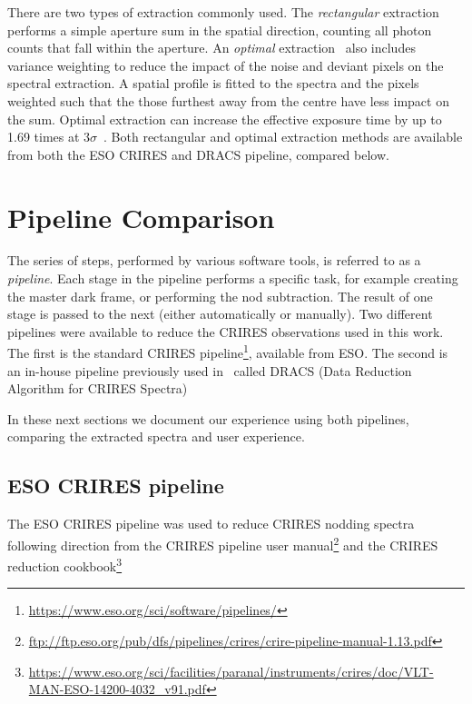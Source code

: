 There are two types of extraction commonly used.
The \emph{rectangular} extraction performs a simple aperture sum in the spatial direction, counting all photon counts that fall within the aperture.
An \emph{optimal} extraction~\citep{horne_optimal_1986} also includes variance weighting to reduce the impact of the noise and deviant pixels on the spectral extraction.
A spatial profile is fitted to the spectra and the pixels weighted such that the those furthest away from the centre have less impact on the sum.
Optimal extraction can increase the effective exposure time by up to 1.69 times at \(3 \sigma\)~\citep{horne_optimal_1986}.
Both rectangular and optimal extraction methods are available from both the {ESO} {CRIRES} and {DRACS} pipeline, compared below.

\section{Pipeline Comparison}
\label{sec:pipelines}
 The series of steps, performed by various software tools, is referred to as a \emph{pipeline}.
Each stage in the pipeline performs a specific task, for example creating the master dark frame, or performing the nod subtraction.
The result of one stage is passed to the next (either automatically or manually).
Two different pipelines were available to reduce the {CRIRES} observations used in this work.
The first is the standard {CRIRES} pipeline\footnote{\href{https://www.eso.org/sci/software/pipelines/}{https://www.eso.org/sci/software/pipelines/}}, available from {ESO}.
The second is an in-house pipeline previously used in~\citet{figueira_radial_2010} called {DRACS} (Data Reduction Algorithm for {CRIRES} Spectra) 

In these next sections we document our experience using both pipelines, comparing the extracted spectra and user experience.


\subsection{{ESO} {CRIRES} pipeline}
\label{subsec:eso-crires}
The {ESO} {CRIRES} pipeline was used to reduce {CRIRES} nodding spectra following direction from the {CRIRES} pipeline user manual\footnote{\href{ftp://ftp.eso.org/pub/dfs/pipelines/crires/crire-pipeline-manual-1.13.pdf}{ftp://ftp.eso.org/pub/dfs/pipelines/crires/crire-pipeline-manual-1.13.pdf}} and the {CRIRES} reduction cookbook\footnote{\href{https://www.eso.org/sci/facilities/paranal/instruments/crires/doc/VLT-MAN-{ESO}-14200-4032\_v91.pdf}{https://www.eso.org/sci/facilities/paranal/instruments/crires/doc/VLT-MAN-{ESO}-14200-4032\_v91.pdf}}

